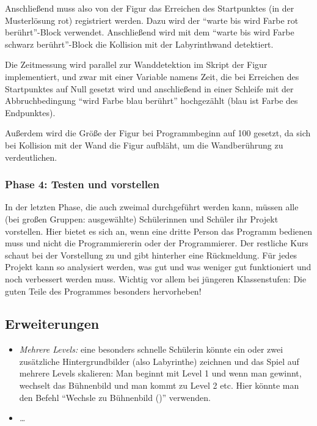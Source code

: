Anschließend muss also von der Figur das Erreichen des Startpunktes (in
der Musterlösung rot) registriert werden. Dazu wird der ``warte bis wird
Farbe rot berührt''-Block verwendet. Anschließend wird mit dem ``warte
bis wird Farbe schwarz berührt''-Block die Kollision mit der
Labyrinthwand detektiert.

Die Zeitmessung wird parallel zur Wanddetektion im Skript der Figur
implementiert, und zwar mit einer Variable namens Zeit, die bei
Erreichen des Startpunktes auf Null gesetzt wird und anschließend in
einer Schleife mit der Abbruchbedingung ``wird Farbe blau berührt''
hochgezählt (blau ist Farbe des Endpunktes).

Außerdem wird die Größe der Figur bei Programmbeginn auf 100 gesetzt, da
sich bei Kollision mit der Wand die Figur aufbläht, um die Wandberührung
zu verdeutlichen.

\subsubsection{Phase 4: Testen und
vorstellen}\label{phase-4-testen-und-vorstellen}

In der letzten Phase, die auch zweimal durchgeführt werden kann, müssen
alle (bei großen Gruppen: ausgewählte) Schülerinnen und Schüler ihr
Projekt vorstellen. Hier bietet es sich an, wenn eine dritte Person das
Programm bedienen muss und nicht die Programmiererin oder der
Programmierer. Der restliche Kurs schaut bei der Vorstellung zu und gibt
hinterher eine Rückmeldung. Für jedes Projekt kann so analysiert werden,
was gut und was weniger gut funktioniert und noch verbessert werden
muss. Wichtig vor allem bei jüngeren Klassenstufen: Die guten Teile des
Programmes besonders hervorheben!

\subsection{Erweiterungen}\label{erweiterungen}

\begin{itemize}
\item
  \emph{Mehrere Levels:} eine besonders schnelle Schülerin könnte ein
  oder zwei zusätzliche Hintergrundbilder (also Labyrinthe) zeichnen und
  das Spiel auf mehrere Levels skalieren: Man beginnt mit Level 1 und
  wenn man gewinnt, wechselt das Bühnenbild und man kommt zu Level 2
  etc. Hier könnte man den Befehl ``Wechsle zu Bühnenbild ()''
  verwenden.
\item
  \emph{\ldots{}}
\end{itemize}
